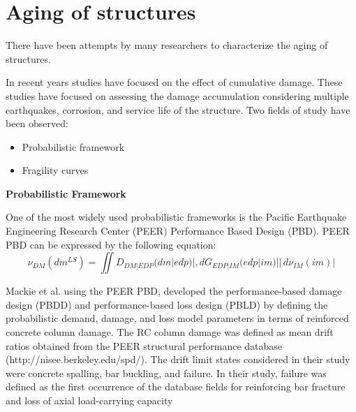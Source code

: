 \section{Aging of structures}

There have been attempts by many researchers to characterize the aging of structures.

In recent years studies have focused on the effect of cumulative damage. These studies have focused on assessing the damage accumulation considering multiple earthquakes, corrosion, and service life of the structure. Two fields of study have been observed:

\begin{itemize}
	\item Probabilistic framework
	\item Fragility curves
\end{itemize}

\textbf{Probabilistic Framework}

One of the most widely used probabilistic frameworks is the Pacific Earthquake Engineering Research Center (PEER) Performance Based Design (PBD). PEER PBD can be expressed by the following equation:
\begin{equation}
\nu_{DM}(dm^{LS})=\iint D_{DM|EDP}(dm|edp)|,dG_{EDP|IM}(edp|im)||\,d\nu_{IM}(im)|
\end{equation}

Mackie et al. \cite{Mackie2007} using the PEER PBD, developed the performance-based damage design (PBDD) and performance-based loss design (PBLD) by defining the probabilistic demand, damage, and loss model parameters in terms of reinforced concrete column damage. The RC column damage was defined as mean drift ratios obtained from the PEER structural performance database (http://nisee.berkeley.edu/spd/). The drift limit states considered in their study were concrete spalling, bar buckling, and failure. In their study, failure was defined as the first occurrence of the database fields for reinforcing bar fracture and loss of axial load-carrying capacity 

